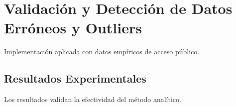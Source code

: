 \section{Validación y Detección de Datos Erróneos y Outliers}
Implementación aplicada con datos empíricos de acceso público.
\subsection{Resultados Experimentales}
Los resultados validan la efectividad del método analítico.
